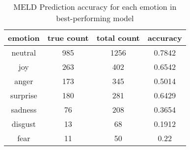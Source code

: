 \documentclass[11pt]{article}
\begin{document}
\begin{table}[hbt]
  \centering
  \begin{tabular}{c|c|c|c}
    emotion & true count & total count & accuracy \\
    \hline
    neutral & 985 & 1256 & 0.7842 \\
    \hline
    joy & 263 & 402 & 0.6542 \\
    \hline
    anger & 173 & 345 & 0.5014  \\
    \hline
    surprise & 180 & 281 & 0.6429 \\
    \hline
    sadness & 76 & 208 & 0.3654\\
    \hline
    disgust  & 13 & 68 & 0.1912  \\
    \hline
    fear & 11 & 50 & 0.22 \\
  \end{tabular}
  \caption{MELD Prediction accuracy for each emotion in best-performing model}
\end{table}
\end{document}
